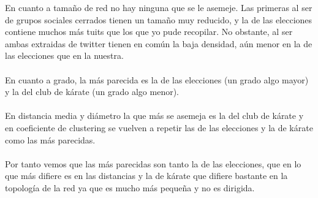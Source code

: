 En cuanto a tamaño de red no hay ninguna que se le asemeje. Las primeras al ser de grupos sociales cerrados tienen un tamaño muy reducido, y la de las elecciones contiene muchos más tuits que los que yo pude recopilar. No obstante, al ser ambas extraidas de twitter tienen en común la baja densidad, aún menor en la de las elecciones que en la nuestra.
\\ \\
En cuanto a grado, la más parecida es la de las elecciones (un grado algo mayor) y la del club de kárate (un grado algo menor).
\\ \\
En distancia media y diámetro la que más se asemeja es la del club de kárate y en coeficiente de clustering se vuelven a repetir las de las elecciones y la de kárate como las más parecidas.
\\ \\
Por tanto vemos que las más parecidas son tanto la de las elecciones, que en lo que más difiere es en las distancias y la de kárate que difiere bastante en la topología de la red ya que es mucho más pequeña y no es dirigida.


\newpage


